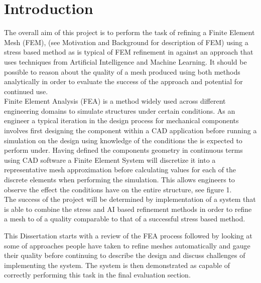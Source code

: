 \section{Introduction}

The overall aim of this project is to perform the task of refining a Finite Element Mesh (FEM), (see Motivation and Background for description of FEM) using a stress based method as is typical of FEM refinement in against an approach that uses techniques from Artificial Intelligence and Machine Learning. It should be possible to reason about the quality of a mesh produced using both methods analytically in order to evaluate the success of the approach and potential for continued use.\\

\noindent
Finite Element Analysis (FEA) is a method widely used across different engineering domains to simulate structures under certain conditions. As an engineer a typical iteration in the design process for mechanical components involves first designing the component within a CAD application before running a simulation on the design using knowledge of the conditions the is expected to perform under. Having defined the components geometry in continuous terms using CAD software a Finite Element System will discretize it into a representative mesh approximation before calculating values for each of the discrete elements when performing the simulation. This allows engineers to observe the effect the conditions have on the entire structure, see figure 1. \\ 

\noindent
The success of the project will be determined by implementation of a system that is able to combine the stress and AI based refinement methods in order to refine a mesh to of a quality comparable to that of a successful stress based method.

\noindent
This Dissertation starts with a review of the FEA process followed by looking at some of approaches people have taken to refine meshes automatically and gauge their quality before continuing to describe the design and discuss challenges of implementing the system. The system is then demonstrated as capable of correctly performing this task in the final evaluation section. 